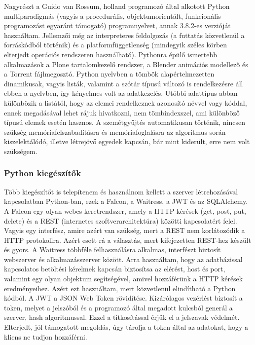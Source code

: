 \documentclass[12pt,a4paper]{report}
\begin{document}
Nagyrészt a Guido van Rossum, holland programozó által alkotott Python multiparadigmás 
(vagyis a procedurális, objektumorientált, funkcionális programozást egyaránt támogató)
programnyelvet, annak 3.8.2-es verzióját használtam. Jellemzői még az interpreteres 
feldolgozás (a futtatás közvetlenül a forráskódból történik) és a platformfüggetlenség 
(mindegyik széles körben elterjedt operációs rendszeren használható). Pythonra épülő
ismertebb alkalmazások a Plone tartalomkezelő rendszer, a Blender animációs modellező
és a Torrent fájlmegosztó. Python nyelvben a tömbök alapértelmezetten dinamikusak, vagyis
listák, valamint a szótár típusú változó is rendelkezésre áll ebben a nyelvben, így 
kényelmes volt az adatkezelés. Utóbbi adattípus abban különbözik a listától, hogy az 
elemei rendelkeznek azonosító névvel vagy kóddal, ennek megadásával lehet rájuk hivatkozni, 
nem tömbindexszel, ami különböző típusú elemek esetén hasznos. A szemétgyűjtés 
automatikusan történik, nincsen szükség memóriafelszabadításra és memóriafoglalásra az 
algoritmus során kiszelektálódó, illetve létrejövő egyedek kapcsán, bár mint kiderült,
erre nem volt szükségem.

\subsubsection{Python kiegészítők}

Több kiegészítőt is telepítenem és használnom kellett a szerver létrehozásával kapcsolatban Python-ban, ezek a Falcon, a Waitress, a JWT és az SQLAlchemy. A Falcon egy olyan webes keretrendszer, amely a HTTP kérések (get, post, put, delete) és a REST (internetes szoftverarchitektúra) közötti  kapcsolatért felel. Vagyis egy interfész, amire azért van szükség, mert a REST nem korlátozódik a HTTP protokollra. Azért esett rá a választás, mert kifejezetten REST-hez készült és gyors. A Waitress többféle felhasználásra alkalmas, interfészt biztosít webszerver és alkalmazásszerver között. Arra használtam, hogy az adatbázissal kapcsolatos betöltési kérelmek kapcsán biztosítsa az elérést, host és port, valamint egy olyan objektum segítségével, amivel hozzáférünk a HTTP kérések eredményeihez. Azért ezt használtam, mert közvetlenül elindítható a Python kódból. A JWT a JSON Web Token rövidítése. Kizárólagos vezérlést biztosít a token, melyet a jelszóból és a programozó által megadott kulcsból generál a szerver, hash algoritmussal. Ezzel a titkosítással érjük el a jelszavak védelmét. Elterjedt, jól támogatott megoldás, úgy tárolja a token által az adatokat, hogy a kliens ne tudjon hozzáférni.
\end{document}
